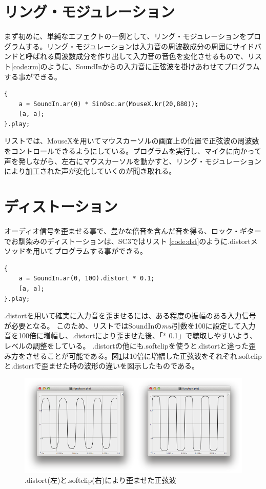 \documentclass{jsarticle}
\begin{document}
\section{リング・モジュレーション}
まず初めに、単純なエフェクトの一例として、リング・モジュレーションをプログラムする。リング・モジュレーションは入力音の周波数成分の周囲にサイドバンドと呼ばれる周波数成分を作り出して入力音の音色を変化させるもので、リスト\ref{code:rm}のように、SoundInからの入力音に正弦波を掛けあわせてプログラムする事ができる。

\begin{lstlisting}[caption=リング・モジュレーション,label=code:rm]
{
	a = SoundIn.ar(0) * SinOsc.ar(MouseX.kr(20,880));
	[a, a];
}.play;
\end{lstlisting}

リストでは、MouseXを用いてマウスカーソルの画面上の位置で正弦波の周波数をコントロールできるようにしている。プログラムを実行し、マイクに向かって声を発しながら、左右にマウスカーソルを動かすと、リング・モジュレーションにより加工された声が変化していくのが聞き取れる。

\section{ディストーション}
オーディオ信号を歪ませる事で、豊かな倍音を含んだ音を得る、ロック・ギターでお馴染みのディストーションは、SC3ではリスト
\ref{code:dst}のように.distortメソッドを用いてプログラムする事ができる。

\begin{lstlisting}[caption=ディストーション, label=code:dst]
{
	a = SoundIn.ar(0, 100).distort * 0.1;
	[a, a];
}.play;
\end{lstlisting}

.distortを用いて確実に入力音を歪ませるには、ある程度の振幅のある入力信号が必要となる。
このため、リストではSoundInの{\it mul}引数を100に設定して入力音を100倍に増幅し、.distortにより歪ませた後、「* 0.1」で聴取しやすいよう、レベルの調整をしている。
.distortの他にも.softclipを使うと.distortと違った歪み方をさせることが可能である。図\ref{fig:comparison}は10倍に増幅した正弦波をそれぞれ.softclipと.distortで歪ませた時の波形の違いを図示したものである。

\begin{figure}[htbp]
	\begin{center}
		\includegraphics[scale=0.6]{comparison.pdf}
	\end{center}
	\caption{.distort(左)と.softclip(右)により歪ませた正弦波}
	\label{fig:comparison}
\end{figure}
\end{document}
